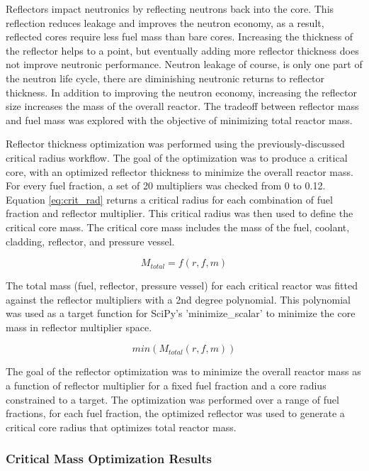Reflectors impact neutronics by reflecting neutrons back into the core. This
reflection reduces leakage and improves the neutron economy, as a result,
reflected cores require less fuel mass than bare cores. Increasing the
thickness of the reflector helps to a point, but eventually adding more reflector
thickness does not improve neutronic performance. Neutron leakage of course, is only
one part of the neutron life cycle, there are diminishing neutronic returns to
reflector thickness. In addition to improving the neutron economy, increasing
the reflector size increases the mass of the overall reactor. The tradeoff
between reflector mass and fuel mass was explored with the objective of
minimizing total reactor mass. 

Reflector thickness optimization was performed using the previously-discussed critical radius
workflow. The goal of the optimization was to produce a
critical core, with an optimized reflector thickness to minimize the
overall reactor mass. For every fuel fraction, a set of 20 multipliers was
checked from 0 to 0.12. Equation \ref{eq:crit_rad} returns a critical radius for
each combination of fuel fraction and reflector multiplier. This critical radius
was then used to define the critical core mass. The critical core mass includes
the mass of the fuel, coolant, cladding, reflector, and pressure vessel.

\begin{equation}
    M_{total} = f(r, f, m)
\end{equation}

The total mass (fuel, reflector, pressure vessel) for each critical
reactor was fitted against the reflector multipliers with a 2nd degree
polynomial. This polynomial was used as a target function for SciPy's
'minimize\_scalar' to minimize the core mass in reflector multiplier space.

\begin{equation}
    min( M_{total}(r, f, m) )
\end{equation}

The goal of the reflector optimization was to minimize the overall reactor mass
as a function of reflector multiplier for a fixed fuel fraction and a core
radius constrained to a \keff target. The optimization was performed over a range
of fuel fractions, for each fuel fraction, the optimized reflector was used to
generate a critical core radius that optimizes total reactor mass.


\subsubsection{Critical Mass Optimization Results}

